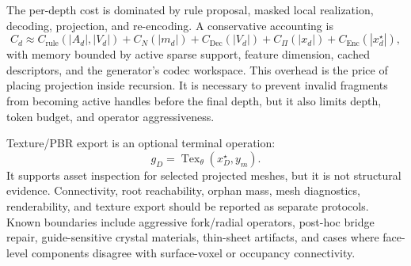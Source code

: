 The per-depth cost is dominated by rule proposal, masked local realization, decoding, projection, and re-encoding. A conservative accounting is
\[
C_d \approx
C_{\mathrm{rule}}(|A_d|,|V_d|)
+
C_{N}(|m_d|)
+
C_{\mathrm{Dec}}(|V_d|)
+
C_{\Pi}(|x_d|)
+
C_{\mathrm{Enc}}(|x_d^\star|),
\]
with memory bounded by active sparse support, feature dimension, cached descriptors, and the generator's codec workspace. This overhead is the price of placing projection inside recursion. It is necessary to prevent invalid fragments from becoming active handles before the final depth, but it also limits depth, token budget, and operator aggressiveness. 

Texture/PBR export is an optional terminal operation:
\[
g_D=\operatorname{Tex}_{\theta}(x_D^\star,y_m).
\]
It supports asset inspection for selected projected meshes, but it is not structural evidence. Connectivity, root reachability, orphan mass, mesh diagnostics, renderability, and texture export should be reported as separate protocols. Known boundaries include aggressive fork/radial operators, post-hoc bridge repair, guide-sensitive crystal materials, thin-sheet artifacts, and cases where face-level components disagree with surface-voxel or occupancy connectivity. 
